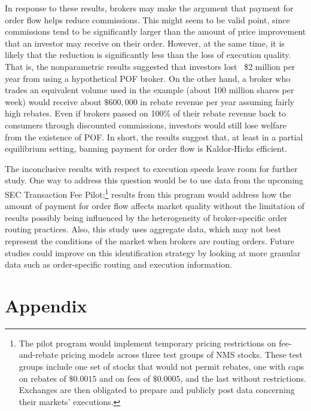 \documentclass[12pt,a4paper]{extarticle}
\begin{document}
In response to these results, brokers may make the argument that payment for order flow helps reduce
commissions. This might seem to be valid point, since commissions tend to be significantly larger than
the amount of price improvement that an investor may receive on their order. However, at
the same time, it is likely that the reduction is significantly less than the loss of execution
quality. That is, the nonparametric results suggested that investors lost ~\$2 million per year from using a hypothetical POF broker. On the other hand, a broker who trades an equivalent volume used in the example (about 100 million shares per week) would receive about $\$600{,}000$ in rebate revenue per year assuming fairly high rebates. Even if brokers passed on 100\% of their rebate revenue back to consumers through discounted commissions, investors would still lose welfare from the existence of POF. In short, the results suggest that, at least in a partial equilibrium setting, banning payment for order flow is Kaldor-Hicks efficient. 



The inconclusive results with respect to execution speeds leave room for further study. One way to address this question would be to use data from the upcoming SEC Transaction Fee Pilot;\footnote{ The pilot program would implement temporary pricing restrictions on fee-and-rebate pricing models across three test groups of NMS stocks. These test groups include one set of stocks that would not permit rebates, one with caps on rebates of $\$0.0015$ and on fees of $\$0.0005$, and the last without restrictions. Exchanges are then obligated to prepare and publicly post data concerning their markets' executions. 
}
results from this program would address how the amount of payment for order flow affects market quality without the limitation of results possibly being influenced by the heterogeneity of broker-specific order routing practices. Also, this study uses aggregate data, which may not best represent the conditions of the market when brokers are routing orders. Future studies could improve on this identification strategy by looking at more granular data such as order-specific routing and execution information.







\pagebreak
\section{Appendix}
\end{document}
